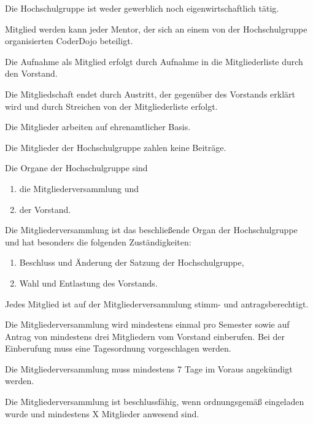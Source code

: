 \documentclass[a4paper, parskip=half, numbers=noenddot]{scrartcl}
\begin{document}
\begin{contract}
Die Hochschulgruppe ist weder gewerblich noch eigenwirtschaftlich tätig.


%
%

%

Mitglied werden kann jeder Mentor, der sich an einem von der Hochschulgruppe
organisierten CoderDojo beteiligt.

Die Aufnahme als Mitglied erfolgt durch Aufnahme in die Mitgliederliste durch
den Vorstand.

Die Mitgliedschaft endet durch Austritt, der gegenüber des Vorstands erklärt wird
und durch Streichen von der Mitgliederliste erfolgt.

Die Mitglieder arbeiten auf ehrenamtlicher Basis.

Die Mitglieder der Hochschulgruppe zahlen keine Beiträge.

%
%


Die Organe der Hochschulgruppe sind

  \begin{enumerate}
  \item die Mitgliederversammlung und
  \item der Vorstand.
  \end{enumerate}


%
%

%

Die Mitgliederversammlung ist das beschließende Organ der Hochschulgruppe und hat besonders die folgenden Zuständigkeiten:
\begin{enumerate}
\item Beschluss und Änderung der Satzung der Hochschulgruppe,
\item Wahl und Entlastung des Vorstands.
\end{enumerate}

Jedes Mitglied ist auf der Mitgliederversammlung stimm- und antragsberechtigt.

Die Mitgliederversammlung wird mindestens einmal pro Semester sowie auf Antrag von mindestens drei Mitgliedern vom Vorstand einberufen. Bei der Einberufung muss eine Tagesordnung vorgeschlagen werden.

Die Mitgliederversammlung muss mindestens 7 Tage im Voraus angekündigt werden.

Die Mitgliederversammlung ist beschlussfähig, wenn ordnungsgemäß eingeladen wurde und mindestens X Mitglieder anwesend sind.


\end{contract}
\end{document}
